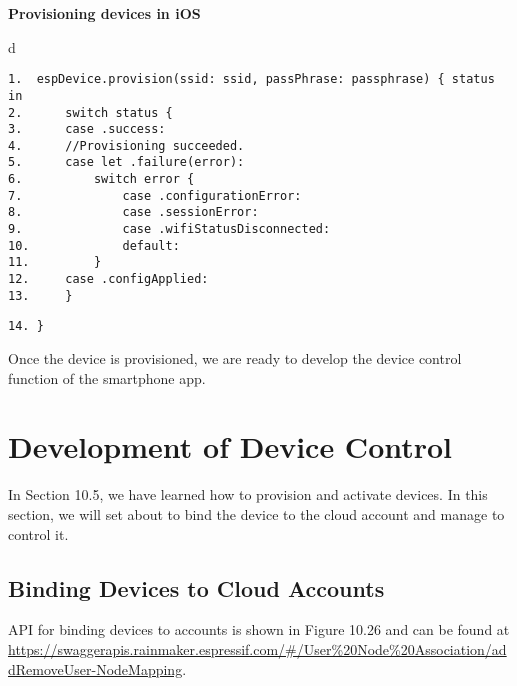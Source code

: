 \documentclass[a4paper,12pt]{book}
\begin{document}
\vspace{6pt}
\textbf{Provisioning devices in iOS}


\begin{codebloc}
\begin{tabular}{d}
\vspace{2pt}
\begin{verbatim}
1.  espDevice.provision(ssid: ssid, passPhrase: passphrase) { status in
2.      switch status {
3.      case .success:
4.      //Provisioning succeeded.
5.      case let .failure(error):
6.          switch error {
7.              case .configurationError:
8.              case .sessionError:
9.              case .wifiStatusDisconnected:
10.             default:
11.         }
12.     case .configApplied:
13.     }
\end{verbatim}
\verb|14. }|
\end{tabular}
\end{codebloc}

Once the device is provisioned, we are ready to develop the device control function of the smartphone app.

\section{Development of Device Control}
In Section 10.5, we have learned how to provision and activate devices. In this section, we will set about to bind the device to the cloud account and manage to control it.

\subsection{Binding Devices to Cloud Accounts}
API for binding devices to accounts is shown in Figure 10.26 and can be found at \href{https://swaggerapis.rainmaker.espressif.com/#/User%20Node%20Association/addRemoveUserNodeMapping}{https://\newline swaggerapis.rainmaker.espressif.com/\#/User\%20Node\%20Association/addRemoveUser-\newline NodeMapping}.
\end{document}

